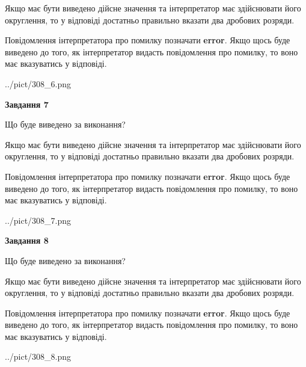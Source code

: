 \documentclass[12pt, ukrainian]{article}
\begin{document}
{\begin {Large}
Якщо має бути виведено дійсне значення та інтерпретатор має здійснювати його округлення, 
то у відповіді достатньо правильно вказати два дробових розряди.

Повідомлення інтерпретатора про помилку позначати \textbf{error}.
Якщо щось буде виведено до того, як інтерпретатор видасть повідомлення про помилку, 
то воно має вказуватись у відповіді. \par

\begin{center}
	{../pict/308_6.png}
\end{center}
\newpage

{\begin {center}\textbf{Завдання 7}\end {center}}\par
Що буде виведено за виконання? \par

Якщо має бути виведено дійсне значення та інтерпретатор має здійснювати його округлення, 
то у відповіді достатньо правильно вказати два дробових розряди.

Повідомлення інтерпретатора про помилку позначати \textbf{error}.
Якщо щось буде виведено до того, як інтерпретатор видасть повідомлення про помилку, 
то воно має вказуватись у відповіді. \par

\begin{center}
	{../pict/308_7.png}
\end{center}
\newpage

{\begin {center}\textbf{Завдання 8}\end {center}}\par
Що буде виведено за виконання? \par

Якщо має бути виведено дійсне значення та інтерпретатор має здійснювати його округлення, 
то у відповіді достатньо правильно вказати два дробових розряди.

Повідомлення інтерпретатора про помилку позначати \textbf{error}.
Якщо щось буде виведено до того, як інтерпретатор видасть повідомлення про помилку, 
то воно має вказуватись у відповіді. \par

\begin{center}
	{../pict/308_8.png}
\end{center}
\newpage


\end{Large}}
\end{document}
